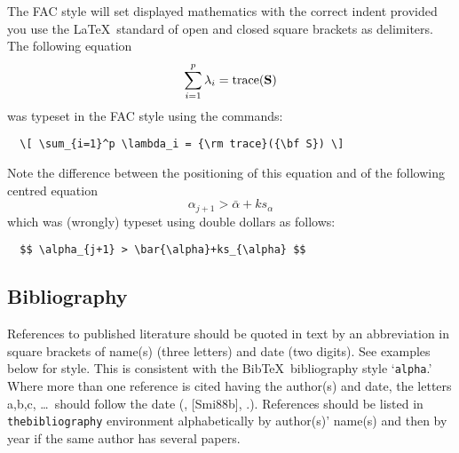 The FAC style will set displayed mathematics with the correct indent
provided you use the \LaTeX\ standard of open and closed square brackets
as delimiters. The following equation
  \[ \sum_{i=1}^p \lambda_i = {\rm trace}({\bf S}) \]
was typeset in the FAC style using the commands:
\begin{verbatim}
  \[ \sum_{i=1}^p \lambda_i = {\rm trace}({\bf S}) \]
\end{verbatim}
Note the difference between the positioning of this equation and of
the following centred equation
  $$ \alpha_{j+1} > \bar{\alpha}+ks_{\alpha} $$
which was (wrongly) typeset using double dollars as follows:
\begin{verbatim}
  $$ \alpha_{j+1} > \bar{\alpha}+ks_{\alpha} $$
\end{verbatim}

\subsection{Bibliography}

References to published literature should be quoted in text by an
abbreviation in square brackets of name(s) (three letters) and date (two
digits). See examples below for style.
This is consistent with the Bib\TeX\ bibliography style `\verb"alpha".'
Where more than one reference is cited having the author(s) and date, the
letters a,b,c, \ldots\ should follow the date (\eg [Smi88a], [Smi88b],
\etc.). References should be listed in \verb"thebibliography" environment
alphabetically by author(s)' name(s) and then by year if the same author
has several papers.

